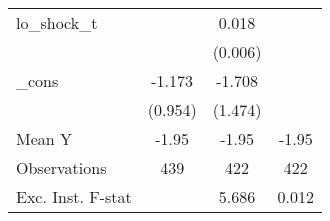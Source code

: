 {\begin{tabular}{l*{3}{c}}
\addlinespace
lo\_shock\_t  &                     &       0.018\sym{***}&                     \\
            &                     &     (0.006)         &                     \\
\addlinespace
\_cons      &      -1.173         &      -1.708         &                     \\
            &     (0.954)         &     (1.474)         &                     \\
\midrule
Mean Y      &       -1.95         &       -1.95         &       -1.95         \\
Observations&         439         &         422         &         422         \\
Exc. Inst. F-stat&                     &       5.686         &       0.012         \\
\bottomrule
\end{tabular}
}
